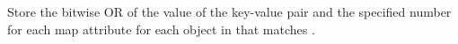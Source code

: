 Store the bitwise OR of the value of the key-value pair and the specified number
for each map attribute for each object in  that matches
.


